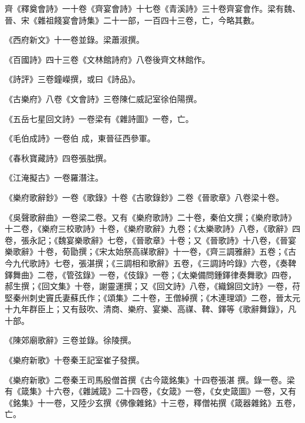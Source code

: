 \begin{pinyinscope}
 齊《釋奠會詩》一十卷《齊宴會詩》十七卷《青溪詩》三十卷齊宴會作。梁有魏、晉、宋《雜祖餞宴會詩集》二十一部，一百四十三卷，亡，今略其數。



 《西府新文》十一卷並錄。梁蕭淑撰。



 《百國詩》四十三卷《文林館詩府》八卷後齊文林館作。



 《詩評》三卷鐘嶸撰，或曰《詩品》。



 《古樂府》八卷《文會詩》三卷陳仁威記室徐伯陽撰。



 《五岳七星回文詩》一卷梁有《雜詩圖》一卷，亡。



 《毛伯成詩》一卷伯
 成，東晉征西參軍。



 《春秋寶藏詩》四卷張朏撰。



 《江淹擬古》一卷羅潛注。



 《樂府歌辭鈔》一卷《歌錄》十卷《古歌錄鈔》二卷《晉歌章》八卷梁十卷。



 《吳聲歌辭曲》一卷梁二卷。又有《樂府歌詩》二十卷，秦伯文撰；《樂府歌詩》十二卷，《樂府三校歌詩》十卷，《樂府歌辭》九卷；《太樂歌詩》八卷，《歌辭》四卷，張永記；《魏宴樂歌辭》七卷，《晉歌章》十卷；又《晉歌詩》十八卷，《晉宴樂歌辭》十卷，荀勖撰；《宋太始祭高禖歌辭》十一卷，《齊三調雅辭》五卷；《古今九代歌詩》七卷，張湛撰；《三調相和歌辭》五卷，《三調詩吟錄》六卷，《奏鞞鐸舞曲》二卷，《管弦錄》一卷，《伎錄》一卷；《太樂備問鍾鐸律奏舞歌》四卷，郝生撰；《回文集》十卷，謝靈運撰；又《回文詩》八卷，《織錦回文詩》一卷，苻堅秦州刺史竇氏妻蘇氏作；《頌集》二十卷，王僧綽撰；《木連理頌》二卷，晉太元十九年群臣上；又有鼓吹、清商、樂府、宴樂、高禖、鞞、鐸等《歌辭舞錄》，凡十部。



 《陳郊廟歌辭》三卷並錄。徐陵撰。



 《樂府新歌》十卷秦王記室崔子發撰。



 《樂府新歌》二卷秦王司馬殷僧首撰《古今箴銘集》十四卷張湛
 撰。錄一卷。梁有《箴集》十六卷，《雜誡箴》二十四卷，《女箴》一卷，《女史箴圖》一卷，又有《銘集》十一卷，又陸少玄撰《佛像雜銘》十三卷，釋僧祐撰《箴器雜銘》五卷，亡。




\end{pinyinscope}

